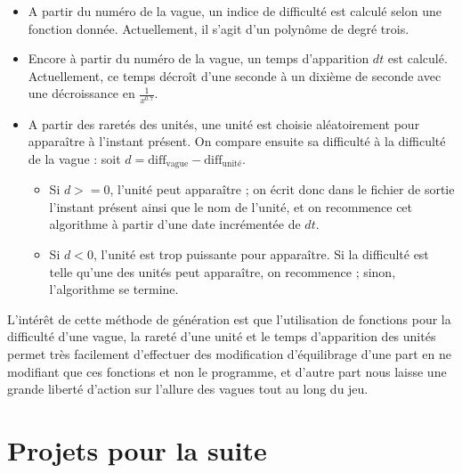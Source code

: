 \documentclass[a4paper,11pt]{article}
\begin{document}
\begin{itemize}
\item A partir du numéro de la vague, un indice de difficulté est calculé selon une fonction donnée. Actuellement, il s'agit d'un polynôme de degré trois.
\item Encore à partir du numéro de la vague, un temps d'apparition $dt$ est calculé. Actuellement, ce temps décroît d'une seconde à un dixième de seconde avec une décroissance en $\frac{1}{x^{0.7}}$.
\item A partir des raretés des unités, une unité est choisie aléatoirement pour apparaître à l'instant présent. On compare ensuite sa difficulté à la difficulté de la vague : soit $d = \text{diff}_{\text{vague}} - \text{diff}_{\text{unité}}$.
  \begin{itemize}
  \item Si $d >= 0$, l'unité peut apparaître ; on écrit donc dans le fichier de sortie l'instant présent ainsi que le nom de l'unité, et on recommence cet algorithme à partir d'une date incrémentée de $dt$.
  \item Si $d < 0$, l'unité est trop puissante pour apparaître. Si la difficulté est telle qu'une des unités peut apparaître, on recommence ; sinon, l'algorithme se termine.
  \end{itemize}
\end{itemize}

L'intérêt de cette méthode de génération est que l'utilisation de fonctions pour la difficulté d'une vague, la rareté d'une unité et le temps d'apparition des unités permet très facilement d'effectuer des modification d'équilibrage d'une part en ne modifiant que ces fonctions et non le programme, et d'autre part nous laisse une grande liberté d'action sur l'allure des vagues tout au long du jeu.


  \section{Projets pour la suite} %
\end{document}
